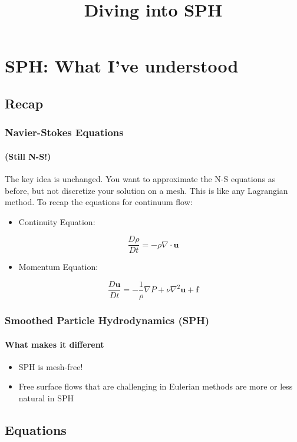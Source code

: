 \documentclass[notheorems, aspectratio=169]{beamer}
\title[Diving into SPH]{Diving into SPH}
\institute[]{}
\date{}
\begin{document}
\begin{frame}
    \titlepage
\end{frame}


\section{SPH: What I've understood} 
\frame{\tableofcontents[currentsection]}

\subsection{Recap}

\begin{frame}[fragile]
  \frametitle{Navier-Stokes Equations}
  \framesubtitle{(Still N-S!)}
  
  The key idea is unchanged. You want to approximate the N-S equations as before, but not discretize your solution on a mesh. This is like any Lagrangian method. To recap the equations for continuum flow:
  
  \begin{itemize}
    \item Continuity Equation:
  \end{itemize}
  
  \[
  \frac{D\rho}{Dt} = -\rho \nabla \cdot \mathbf{u}
  \]
  
  \begin{itemize}
    \item Momentum Equation:
  \end{itemize}
  
  \[
  \frac{D\mathbf{u}}{Dt} = -\frac{1}{\rho}\nabla P + \nu\nabla^2\mathbf{u} + \mathbf{f}
  \]
  
  
  \end{frame}

  
\begin{frame}[fragile]
  \frametitle{Smoothed Particle Hydrodynamics (SPH)}
  \framesubtitle{What makes it different}
  
  \begin{itemize}
    \item SPH is mesh-free!
    \item Free surface flows that are challenging in Eulerian methods are more or less natural in SPH
  \end{itemize}
  
  \end{frame}
  

  \subsection{Equations}
\end{document}
